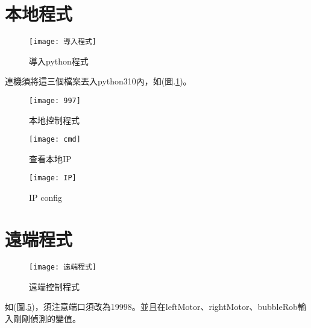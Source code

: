 \section{本地程式}
\begin{figure}[hbt!]
\begin{center}
\texttt{[image: 導入程式]}
\caption{\Large 導入python程式}\label{導入python程式}
\end{center}
\end{figure} 
連機須將這三個檔案丟入python310內，如(圖.\ref{導入python程式})。
\begin{figure}[hbt!]
\begin{center}
\texttt{[image: 997]}
\caption{\Large 本地控制程式}\label{本地控制程式}
\end{center}
\end{figure} 
\begin{figure}[hbt!]
\begin{center}
\texttt{[image: cmd]}
\caption{\Large 查看本地IP}\label{查看本地IP}
\end{center}
\end{figure} 
\begin{figure}[hbt!]
\begin{center}
\texttt{[image: IP]}
\caption{\Large IP config}\label{IP config}
\end{center}
\end{figure} 
\section{遠端程式}
\begin{figure}[hbt!]
\begin{center}
\texttt{[image: 遠端程式]}
\caption{\Large 遠端控制程式}\label{遠端控制程式}
\end{center}
\end{figure} 
如(圖.\ref{遠端控制程式})，須注意端口須改為19998。並且在leftMotor、rightMotor、bubbleRob輸入剛剛偵測的變值。
